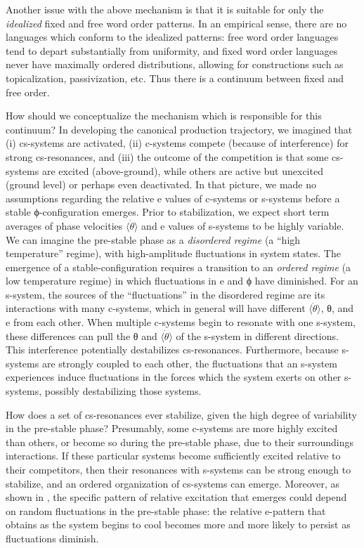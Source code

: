   Another issue with the above mechanism is that it is suitable for only the \textit{idealized} fixed and free word order patterns. In an empirical sense, there are no languages which conform to the idealized patterns: free word order languages tend to depart substantially from uniformity, and fixed word order languages never have maximally ordered distributions, allowing for constructions such as topicalization, passivization, etc. Thus there is a continuum between fixed and free order. 

  How should we conceptualize the mechanism which is responsible for this continuum? In developing the canonical production trajectory, we imagined that (i) cs-systems are activated, (ii) c-systems compete (because of interference) for strong cs-resonances, and (iii) the outcome of the competition is that some cs-systems are excited (above-ground), while others are active but unexcited (ground level) or perhaps even deactivated. In that picture, we made no assumptions regarding the relative e values of c-systems or s-systems before a stable ϕ-configuration emerges. Prior to stabilization, we expect short term averages of phase velocities $\langle\dot{\theta}\rangle$ and e values of s-systems to be highly variable. We can imagine the pre-stable phase as a \textit{disordered regime} (a “high temperature” regime), with high-amplitude fluctuations in system states. The emergence of a stable-configuration requires a transition to an \textit{ordered regime} (a low temperature regime) in which fluctuations in e and ϕ have diminished. For an s-system, the sources of the “fluctuations” in the disordered regime are its interactions with many c-systems, which in general will have different $\langle\dot{\theta}\rangle$, θ, and e from each other. When multiple c-systems begin to resonate with one s-system, these differences can pull the θ and $\langle\dot{\theta}\rangle$ of the s-system in different directions. This interference potentially destabilizes cs-resonances. Furthermore, because s-systems are strongly coupled to each other, the fluctuations that an s-system experiences induce fluctuations in the forces which the system exerts on other s-systems, possibly destabilizing those systems.

  How does a set of cs-resonances ever stabilize, given the high degree of variability in the pre-stable phase? Presumably, some c-systems are more highly excited than others, or become so during the pre-stable phase, due to their surroundings interactions. If these particular systems become sufficiently excited relative to their competitors, then their resonances with s-systems can be strong enough to stabilize, and an ordered organization of cs-systems can emerge. Moreover, as shown in {}, the specific pattern of relative excitation that emerges could depend on random fluctuations in the pre-stable phase: the relative e-pattern that obtains as the system begins to cool becomes more and more likely to persist as fluctuations diminish.

